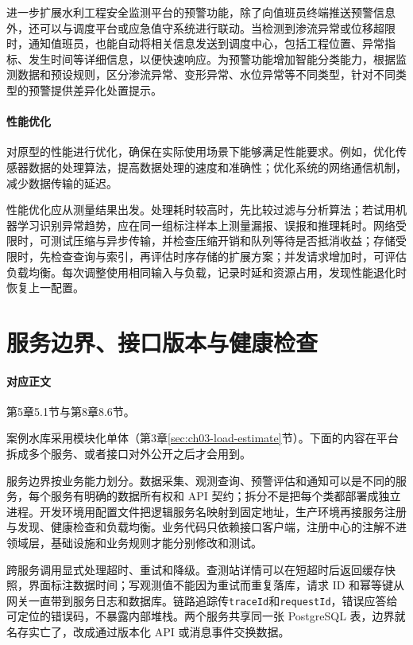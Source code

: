 进一步扩展水利工程安全监测平台的预警功能，除了向值班员终端推送预警信息外，还可以与调度平台或应急值守系统进行联动。当检测到渗流异常或位移超限时，通知值班员，也能自动将相关信息发送到调度中心，包括工程位置、异常指标、发生时间等详细信息，以便快速响应。为预警功能增加智能分类能力，根据监测数据和预设规则，区分渗流异常、变形异常、水位异常等不同类型，针对不同类型的预警提供差异化处置提示。

\paragraph{性能优化}对原型的性能进行优化，确保在实际使用场景下能够满足性能要求。例如，优化传感器数据的处理算法，提高数据处理的速度和准确性；优化系统的网络通信机制，减少数据传输的延迟。

性能优化应从测量结果出发。处理耗时较高时，先比较过滤与分析算法；若试用机器学习识别异常趋势，应在同一组标注样本上测量漏报、误报和推理耗时。网络受限时，可测试压缩与异步传输，并检查压缩开销和队列等待是否抵消收益；存储受限时，先检查查询与索引，再评估时序存储的扩展方案；并发请求增加时，可评估负载均衡。每次调整使用相同输入与负载，记录时延和资源占用，发现性能退化时恢复上一配置。

\section{服务边界、接口版本与健康检查}\label{app:ext-service-boundary}\label{online:ch05-api}

\paragraph{对应正文}第5章5.1节与第8章8.6节。

案例水库采用模块化单体（第3章\ref{sec:ch03-load-estimate}节）。下面的内容在平台拆成多个服务、或者接口对外公开之后才会用到。

服务边界按业务能力划分。数据采集、观测查询、预警评估和通知可以是不同的服务，每个服务有明确的数据所有权和 API 契约；拆分不是把每个类都部署成独立进程。开发环境用配置文件把逻辑服务名映射到固定地址，生产环境再接服务注册与发现、健康检查和负载均衡。业务代码只依赖接口客户端，注册中心的注解不进领域层，基础设施和业务规则才能分别修改和测试。

跨服务调用显式处理超时、重试和降级。查测站详情可以在短超时后返回缓存快照，界面标注数据时间；写观测值不能因为重试而重复落库，请求 ID 和幂等键从网关一直带到服务日志和数据库。链路追踪传\texttt{traceId}和\texttt{requestId}，错误应答给可定位的错误码，不暴露内部堆栈。两个服务共享同一张 PostgreSQL 表，边界就名存实亡了，改成通过版本化 API 或消息事件交换数据。

